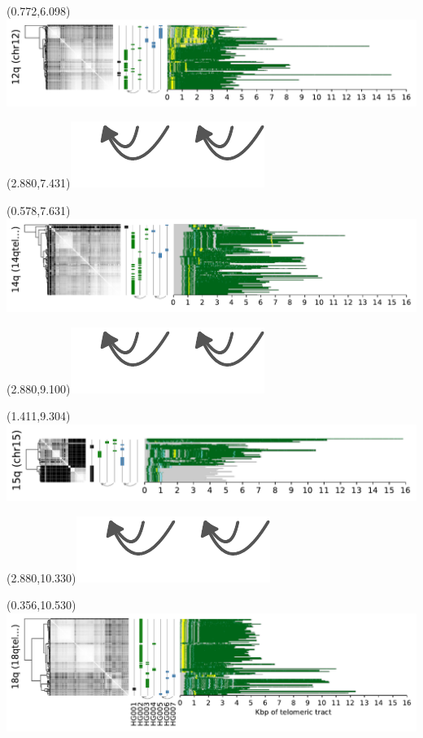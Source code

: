 \documentclass{article}
\begin{document}
\begin{textblock}{13}(0.772,6.098)\includegraphics{Figure_5/chr12.pdf}\end{textblock}
\begin{textblock}{13}(2.880,7.431)\includegraphics[width=.81in,keepaspectratio]{Figure_4/fatter-arrows.pdf}\end{textblock}
\begin{textblock}{13}(0.578,7.631)\includegraphics{Figure_5/14qtel_1-500K_1_12_12_rc.pdf}\end{textblock}
\begin{textblock}{13}(2.880,9.100)\includegraphics[width=.81in,keepaspectratio]{Figure_4/fatter-arrows.pdf}\end{textblock}
\begin{textblock}{13}(1.411,9.304)\includegraphics{Figure_5/chr15.pdf}\end{textblock}
\begin{textblock}{13}(2.880,10.330)\includegraphics[width=.81in,keepaspectratio]{Figure_4/fatter-arrows.pdf}\end{textblock}
\begin{textblock}{13}(0.356,10.530)\includegraphics{Figure_5/18qtel_1-500K_1_12_12_rc.pdf}\end{textblock}
\end{document}
